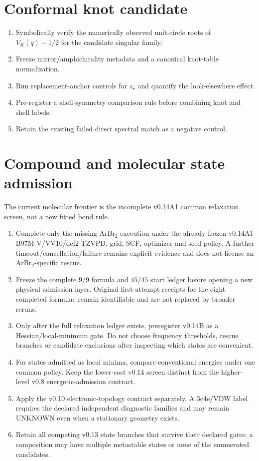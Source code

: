 \section{Conformal knot candidate}
\begin{enumerate}
\item Symbolically verify the numerically observed unit-circle roots of $V_K(q)-1/2$ for the candidate singular family.
\item Freeze mirror/amphichirality metadata and a canonical knot-table normalization.
\item Run replacement-anchor controls for $z_\star$ and quantify the look-elsewhere effect.
\item Pre-register a shell-symmetry comparison rule before combining knot and shell labels.
\item Retain the existing failed direct spectral match as a negative control.
\end{enumerate}

\section{Compound and molecular state admission}
The current molecular frontier is the incomplete v0.14A1 common relaxation screen, not a new fitted bond rule.

\begin{enumerate}
\item Complete only the missing ArBr$_2$ execution under the already frozen v0.14A1 B97M-V/VV10/def2-TZVPD, grid, SCF, optimizer and seed policy.  A further timeout/cancellation/failure remains explicit evidence and does not license an ArBr$_2$-specific rescue.
\item Freeze the complete $9/9$ formula and $45/45$ start ledger before opening a new physical admission layer.  Original first-attempt receipts for the eight completed formulae remain identifiable and are not replaced by broader reruns.
\item Only after the full relaxation ledger exists, preregister v0.14B as a Hessian/local-minimum gate.  Do not choose frequency thresholds, rescue branches or candidate exclusions after inspecting which states are convenient.
\item For states admitted as local minima, compare conventional energies under one common policy.  Keep the lower-cost v0.14 screen distinct from the higher-level v0.8 energetic-admission contract.
\item Apply the v0.10 electronic-topology contract separately.  A 3c4e/VDW label requires the declared independent diagnostic families and may remain UNKNOWN even when a stationary geometry exists.
\item Retain all competing v0.13 state branches that survive their declared gates; a composition may have multiple metastable states or none of the enumerated candidates.
\end{enumerate}

